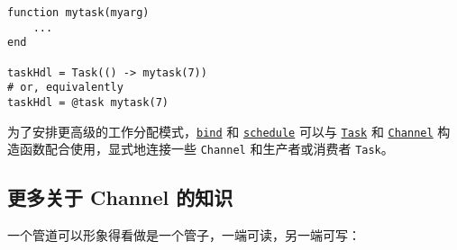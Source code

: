 \begin{verbatim}
function mytask(myarg)
    ...
end

taskHdl = Task(() -> mytask(7))
# or, equivalently
taskHdl = @task mytask(7)
\end{verbatim}



为了安排更高级的工作分配模式，\hyperlink{13811388816704022260}{\texttt{bind}} 和 \hyperlink{9185853093207176818}{\texttt{schedule}} 可以与 \hyperlink{7131243650304654155}{\texttt{Task}} 和 \hyperlink{12548845729684045604}{\texttt{Channel}} 构造函数配合使用，显式地连接一些 \texttt{Channel} 和生产者或消费者 \texttt{Task}。



\hypertarget{9800357313740140825}{}


\subsection{更多关于 Channel 的知识}



一个管道可以形象得看做是一个管子，一端可读，另一端可写：



